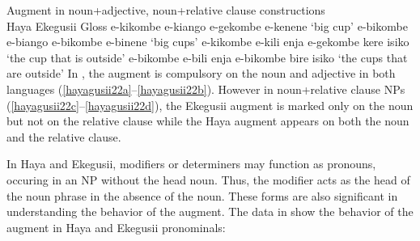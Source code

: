 \documentclass[output=paper]{langscibook}
\begin{document}
\ea Augment in noun+adjective, noun+relative clause constructions\smallskip\\
\label{hayagusii22}
  \hphantom{abc }Haya				\hphantom{ombe e-kili enja }Ekegusii 			\hphantom{be e-kenene }Gloss
  \ea\label{hayagusii22a}	e-kikombe e-kiango\hphantom{ji}\hspace{.5ex}		e-gekombe e-kenene\hphantom{i}		‘big cup’
  \ex\label{hayagusii22b} e-bikombe e-biango\hphantom{ji}\hspace{.5ex}		e-bikombe e-binene\hphantom{ti}		‘big cups’
  \ex\label{hayagusii22c}	 e-kikombe e-kili enja\hspace{.5ex}		e-gekombe kere isiko		‘the cup that is outside’
  \ex\label{hayagusii22d} e-bikombe e-bili enja\hspace{.5ex}		e-bikombe bire isiko\hphantom{a}		‘the cups that are outside’
  \z
\z
In , the augment is compulsory on the noun and adjective in both languages (\ref{hayagusii22a}--\ref{hayagusii22b}). However in noun+relative clause NPs (\ref{hayagusii22c}--\ref{hayagusii22d}), the Ekegusii augment is marked only on the noun but not on the relative clause while the Haya augment appears on both the noun and the relative clause.

	In Haya and Ekegusii, modifiers or determiners may function as pronouns, occuring in an NP without the head noun. Thus, the modifier acts as the head of the noun phrase in the absence of the noun. These forms are also significant in understanding the behavior of the augment. The data in  show the behavior of the augment in Haya and Ekegusii pronominals:
\end{document}
